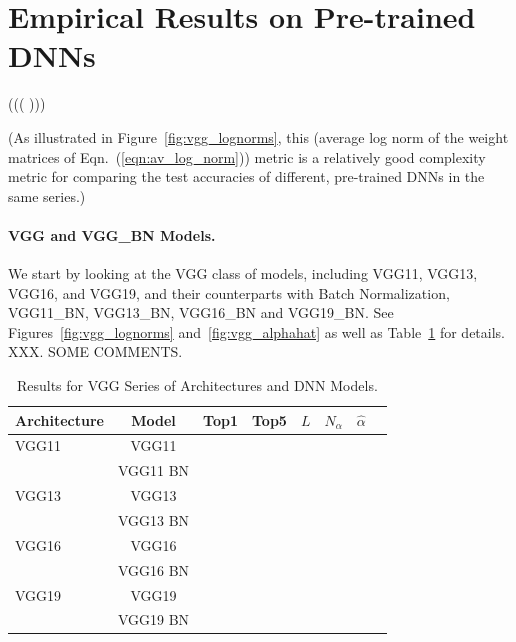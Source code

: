 
\section{Empirical Results on Pre-trained DNNs}
\label{sxn:emp}

(((
)))

(As illustrated in Figure~\ref{fig:vgg_lognorms}, this 
(average log norm of the weight matrices of Eqn.~(\ref{eqn:av_log_norm}))
metric is a relatively good complexity metric for comparing the test accuracies of different, pre-trained DNNs in the same series.)


\paragraph{VGG and VGG\_BN Models.}

We start by looking at the VGG class of models, including VGG11, VGG13, VGG16, and VGG19, and their counterparts with Batch Normalization, VGG11\_BN, VGG13\_BN, VGG16\_BN and VGG19\_BN.  
See Figures~\ref{fig:vgg_lognorms} and~\ref{fig:vgg_alphahat} as well as Table~\ref{table:models_VGG} for details.
XXX.  SOME COMMENTS.

\begin{table}[t]
\small
\begin{center}
\begin{tabular}{|p{1in}|c|c|c|c|c|c|c|}
\hline
Architecture 
 & Model &Top1 
 & Top5 & $L$ & $N_{\alpha}$ & $\hat{\alpha}$ \\
\hline
VGG11 & VGG11 & & & & & \\
  & VGG11 BN & & & & & \\
\hline
VGG13 & VGG13 & & & & & \\
  & VGG13 BN & & & & & \\
\hline
VGG16 & VGG16 & & & & & \\
  & VGG16 BN & & & & & \\
\hline
VGG19 & VGG19 & & & & & \\
  & VGG19 BN & & & & & \\
\hline
\end{tabular}
\end{center}
\caption{Results for VGG Series of Architectures and DNN Models.}
\label{table:models_VGG}
\end{table}


